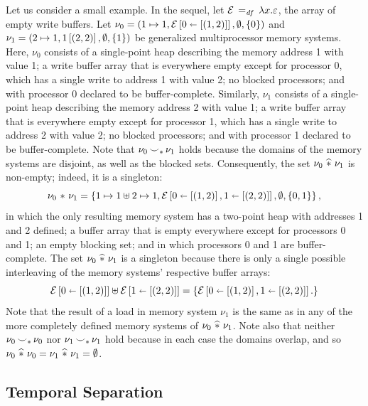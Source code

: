 \documentclass[11pt]{report}
\begin{document}
Let us consider a small example. In the sequel, let $\mathcal{E} \operatorname{\;=_{\mathit{df}}\;} \lambda x . \varepsilon$, the array of empty write buffers. Let $\nu_0 = (1 \mapsto 1, \mathcal{E} \left[ 0 \shortleftarrow \left[(1,2)\right] \right],\operatorname{\emptyset},\left\lbrace 0 \right\rbrace)$ and $\nu_1 = (2 \mapsto 1, 1 \left[ (2,2) \right],\operatorname{\emptyset},\left\lbrace 1 \right\rbrace)$ be generalized multiprocessor memory systems. Here, $\nu_0$ consists of a single-point heap describing the memory address 1 with value 1; a write buffer array that is everywhere empty except for processor 0, which has a single write to address 1 with value 2; no blocked processors; and with processor 0 declared to be buffer-complete. Similarly, $\nu_1$ consists of a single-point heap describing the memory address 2 with value 1; a write buffer array that is everywhere empty except for processor 1, which has a single write to address 2 with value 2; no blocked processors; and with processor 1 declared to be buffer-complete. Note that $\nu_0 \operatorname{\smile}_\ast \nu_1$ holds because the domains of the memory systems are disjoint, as well as the blocked sets. Consequently, the set $\nu_0 \operatorname{\,\widehat{\ast}\,} \nu_1$ is non-empty; indeed, it is a singleton: \[ \nu_0 \operatorname{\,\ast\,} \nu_1 = \left\lbrace 1 \mapsto 1 \uplus 2 \mapsto 1, \mathcal{E} \left[ 0 \shortleftarrow \left[(1,2)\right], 1 \shortleftarrow \left[(2,2)\right] \right],\operatorname{\emptyset},\left\lbrace 0,1 \right\rbrace \right\rbrace,\] in which the only resulting memory system has a two-point heap with addresses 1 and 2 defined; a buffer array that is empty everywhere except for processors 0 and 1; an empty blocking set; and in which processors 0 and 1 are buffer-complete. The set $\nu_0 \operatorname{\,\widehat{\ast}\,} \nu_1$ is a singleton because there is only a single possible interleaving of the memory systems' respective buffer arrays: \[\mathcal{E} \left[ 0 \shortleftarrow \left[(1,2)\right] \right] \uplus \mathcal{E} \left[ 1 \shortleftarrow \left[(2,2)\right] \right] = \left\lbrace  \mathcal{E} \left[ 0 \shortleftarrow \left[(1,2)\right], 1 \shortleftarrow \left[(2,2)\right] \right]. \right\rbrace\] Note that the result of a load in memory system $\nu_1$ is the same as in any of the more completely defined memory systems of $\nu_0 \operatorname{\,\widehat{\ast}\,} \nu_1$. Note also that neither $\nu_0 \operatorname{\smile}_\ast \nu_0$ nor $\nu_1 \operatorname{\smile}_\ast \nu_1$ hold because in each case the domains overlap, and so $\nu_0 \operatorname{\,\widehat{\ast}\,} \nu_0 = \nu_1 \operatorname{\,\widehat{\ast}\,} \nu_1 = \operatorname{\emptyset}$. 

\subsection{Temporal Separation}
\label{sec:temporal-separation}
\end{document}
